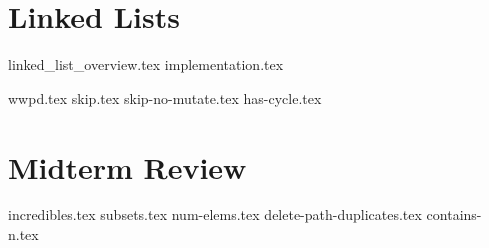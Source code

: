 \documentclass{exam}
\begin{document}
\section{Linked Lists}
{linked_list_overview.tex}
{implementation.tex}
\newpage
\begin{questions}
{wwpd.tex}
\newpage
{skip.tex}
{skip-no-mutate.tex}
{has-cycle.tex}
\end{questions}

\newpage
\section{Midterm Review}
\begin{questions}
{incredibles.tex}
{subsets.tex}
\newpage
{num-elems.tex}
\newpage
{delete-path-duplicates.tex}
{contains-n.tex}
\end{questions}
\end{document}
